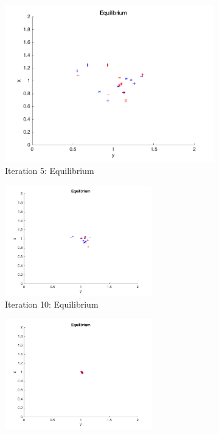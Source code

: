 \begin{figure}[H]
\begin{subfigure}[b]{0.45\textwidth}
\begin{center}
\includegraphics[width=\textwidth]{img/mdme/equilibrium5}
\caption{Iteration 5: Equilibrium}
\end{center}
\end{subfigure}
\begin{subfigure}[b]{0.45\textwidth}
\begin{center}
\includegraphics[width=0.7\textwidth]{img/mdme/equilibrium10}
\caption{Iteration 10: Equilibrium}
\end{center}
\end{subfigure}
\begin{subfigure}[b]{0.45\textwidth}
\begin{center}
\includegraphics[width=0.7\textwidth]{img/mdme/equilibrium25}

\end{center}
\end{subfigure}
\end{figure}
